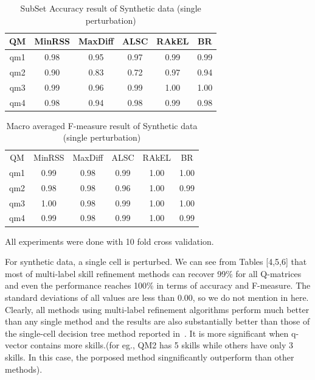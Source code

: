 \documentclass[11pt]{article}
\begin{document}
\begin {table}[h]
\scriptsize
\centering
\begin{tabular}{c|c|c|c|c|c}	
	\hline\hline	
QM  & MinRSS  & MaxDiff  & ALSC  & RAkEL & BR    \\  \hline
qm1  & 0.98 & 0.95 & 0.97 & 0.99 & 0.99  \\
qm2  & 0.90 & 0.83 & 0.72 & 0.97 & 0.94  \\
qm3  & 0.99 & 0.96 & 0.99 & 1.00 & 1.00  \\
qm4  & 0.98 &  0.94 & 0.98 & 0.99 & 0.98  \\
\hline\hline
\end{tabular}
\caption {SubSet Accuracy result of Synthetic data (single perturbation)} \label{ref:Syn_SA} 
\end{table}



\begin {table}[h]
\scriptsize
\centering
\begin{tabular}{c|c|c|c|c|c}	
	\hline\hline	
 QM  &  MinRSS & MaxDiff  &  ALSC  &  RAkEL &  BR  \\ 
 qm1  & 0.99 & 0.98 & 0.99 & 1.00 & 1.00  \\  
 qm2  & 0.98 & 0.98 & 0.96 & 1.00 & 0.99  \\
 qm3  & 1.00 & 0.98 & 0.99 & 1.00 & 1.00  \\
 qm4  & 0.99 & 0.98 & 0.99 & 1.00 & 0.99  \\
\hline\hline
\end{tabular}
\caption {Macro averaged F-measure result of Synthetic data (single perturbation)} \label{ref:Syn_FM} 
\end{table}

All experiments were done with 10 fold cross validation.

 
 For synthetic data, a single cell is perturbed. We can see from Tables [4,5,6]
that most of multi-label skill refinement methods can recover 99\% for all
Q-matrices and even the performance reaches 100\% in terms of accuracy
and F-measure. The standard deviations of all values are less than 0.00, so we do not mention in here. Clearly, all methods using multi-label refinement algorithms perform much better than any single method and the results are also substantially better than those of the single-cell decision tree method reported in~\cite{desmarais2015combining}. It is more significant when q-vector contains more skills.(for eg., QM2 has 5 skills while others have only 3 skills. In this case, the porposed method singnificantly outperform than other methods). 
\end{document}
